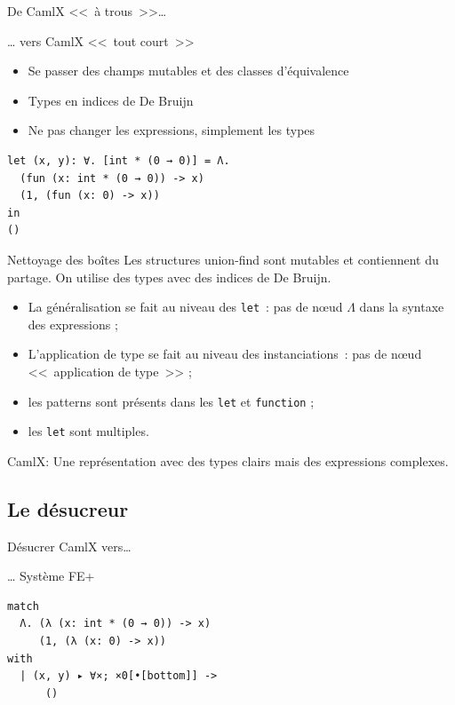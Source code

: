 \documentclass[final]{beamer}
\begin{document}
\begin{frame}[fragile]{De CamlX <<~à trous~>>…}

  … vers CamlX <<~tout court~>>

  \begin{itemize}
    \item Se passer des champs mutables et des classes d'équivalence
    \item Types en indices de De Bruijn
    \item Ne pas changer les expressions, simplement les types
  \end{itemize}

  \begin{verbatim}
let (x, y): ∀. [int * (0 → 0)] = Λ. 
  (fun (x: int * (0 → 0)) -> x)
  (1, (fun (x: 0) -> x))
in
()
  \end{verbatim}
\end{frame}

\begin{frame}{Nettoyage des boîtes}
 Les structures union-find sont mutables et contiennent du partage. On utilise
 des types avec des indices de De Bruijn.

 \begin{itemize}
   \item La généralisation se fait au niveau des \texttt{let}~: pas de nœud
     $\Lambda$ dans la syntaxe des expressions ;
   \item L'application de type se fait au niveau des instanciations~: pas de
     nœud <<~application de type~>> ;
   \item les patterns sont présents dans les \texttt{let} et \texttt{function} ;
   \item les \texttt{let} sont multiples.
 \end{itemize}

 \begin{block}{CamlX:}
 Une représentation avec des types clairs mais des expressions complexes.
 \end{block}
\end{frame}

\subsection{Le désucreur}

\begin{frame}[fragile]{Désucrer CamlX vers…}

… Système FE+

  \begin{verbatim}
match
  Λ. (λ (x: int * (0 → 0)) -> x)
     (1, (λ (x: 0) -> x))
with
  | (x, y) ▸ ∀×; ×0[•[bottom]] ->
      ()
  \end{verbatim}

\end{frame}
\end{document}
